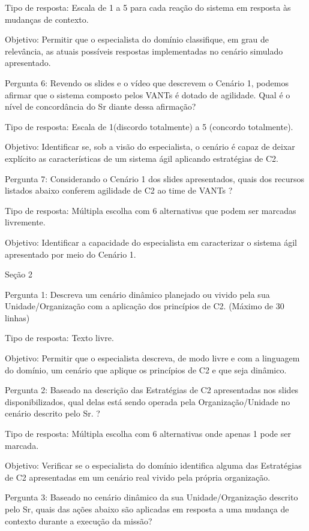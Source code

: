 Tipo de resposta: Escala de 1 a 5 para cada reação do sistema em resposta às mudanças de contexto.

Objetivo: Permitir que o especialista do domínio classifique, em grau de relevância, as atuais possíveis respostas implementadas no cenário simulado apresentado.


Pergunta 6: Revendo os slides e o vídeo que descrevem o Cenário 1, podemos afirmar que o sistema composto pelos VANTs é dotado de agilidade. Qual é o nível de concordância do Sr diante dessa afirmação? 

Tipo de resposta: Escala de 1(discordo totalmente) a 5 (concordo totalmente).

Objetivo: Identificar se, sob a visão do especialista, o cenário é capaz de deixar explícito as características de um sistema ágil aplicando estratégias de C2.


Pergunta 7: Considerando o Cenário 1 dos slides apresentados, quais dos recursos listados abaixo conferem agilidade de C2 ao time de VANTs ?


Tipo de resposta: Múltipla escolha com 6 alternativas que podem ser marcadas livremente. 

Objetivo: Identificar a capacidade do especialista em caracterizar o sistema ágil apresentado por meio do Cenário 1.




Seção 2

Pergunta 1: Descreva um cenário dinâmico planejado ou vivido pela sua Unidade/Organização com a aplicação dos princípios de C2. (Máximo de 30 linhas)

Tipo de resposta: Texto livre.

Objetivo: Permitir que o especialista descreva, de modo livre e com a linguagem do domínio, um cenário que aplique os princípios de C2 e que seja dinâmico.


Pergunta 2: Baseado na descrição das Estratégias de C2 apresentadas nos slides disponibilizados, qual delas está sendo operada pela Organização/Unidade no cenário descrito pelo Sr. ?

Tipo de resposta: Múltipla escolha com 6 alternativas onde apenas 1 pode ser marcada.

Objetivo: Verificar se o especialista do domínio identifica alguma das Estratégias de C2 apresentadas em um cenário real vivido pela própria organização.


Pergunta 3: Baseado no cenário dinâmico da sua Unidade/Organização descrito pelo Sr, quais das ações abaixo são aplicadas em resposta a uma mudança de contexto durante a execução da missão?

